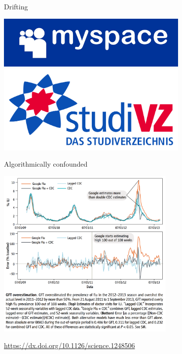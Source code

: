 \documentclass{beamer}
\def\vf{\vfill}
\begin{document}
\begin{frame}{Drifting}

\begin{center}
	\includegraphics[width=0.7\textwidth]{figures/myspace_2012_original_logo.png}
	\\
	\includegraphics[width=0.7\textwidth]{figures/studivz_logo.png}
\end{center}

\end{frame}

\begin{frame}{Algorithmically confounded}

\begin{center}
	\includegraphics[width=0.65\textwidth]{figures/google_flu.png}

\end{center}
\vf
\tiny{\url{https://dx.doi.org/10.1126/science.1248506}}


\end{frame}
\end{document}

